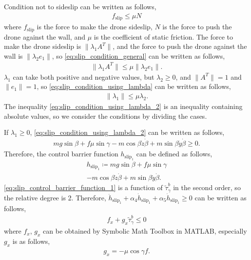 Condition not to sideslip can be written as follows,
\begin{align}
    \label{eq:slip_condition_general}
    f_{\mathrm{slip}} \leq \mu N
\end{align}
where $ f_{\mathrm{slip}} $ is the force to make the drone sideslip, $ N $ is the force to push the drone against the wall, and $ \mu $ is the coefficient of static friction.
The force to make the drone sideslip is $ \| \lambda_1 A^T \| $, and the force to push the drone against the wall is $ \| \lambda_2 e_1 \| $, so \eqref{eq:slip_condition_general} can be written as follows,
\begin{align}
    \label{eq:slip_condition_using_lambda}
    \| \lambda_1 A^T \| \leq \mu \| \lambda_2 e_1 \|.
\end{align}
$ \lambda_1 $ can take both positive and negative values, but $ \lambda_2 \geq 0 $, and $ \| A^T \| = 1 $ and $ \| e_1 \| = 1 $, so \eqref{eq:slip_condition_using_lambda} can be written as follows,
\begin{align}
    \label{eq:slip_condition_using_lambda_2}
    \| \lambda_1 \| \leq \mu \lambda_2.
\end{align}
The inequality \eqref{eq:slip_condition_using_lambda_2} is an inequality containing absolute values, so we consider the conditions by dividing the cases.

If $ \lambda_1 \geq 0 $, \eqref{eq:slip_condition_using_lambda_2} can be written as follows,
\begin{align}
    \label{eq:slip_condition_using_lambda_5}
    mg \sin \beta + f \mu \sin \gamma - m \cos \beta \dot{z} \dot{\beta} + m \sin \beta \dot{y} \dot{\beta} \geq 0.
\end{align}
Therefore, the control barrier function $ h_{\mathrm{slip}_1} $ can be defined as follows,
\begin{align}
    h_{\mathrm{slip}_1} \coloneqq mg \sin \beta + f \mu \sin \gamma \\
    - m \cos \beta \dot{z} \dot{\beta} + m \sin \beta \dot{y} \dot{\beta}.
    \label{eq:slip_control_barrier_function_1}
\end{align}
\eqref{eq:slip_control_barrier_function_1} is a function of $ \tilde{\tau}_{\gamma}^b $ in the second order, so the relative degree is 2.
Therefore, $ \ddot{h}_{\mathrm{slip}_1} + \alpha_4 \dot{h}_{\mathrm{slip}_1}  + \alpha_5 \dot{h}_{\mathrm{slip}_1} \geq 0 $ can be written as follows,
\begin{align}
    \label{eq:sideslipQP_1}
    f_x + g_x \tilde{\tau}_{\gamma}^b \leq 0
\end{align}
where $ f_x $, $ g_x $ can be obtained by Symbolic Math Toolbox in MATLAB, especially $ g_x $ is as follows,
\begin{align*}
    g_x = - \mu \cos \gamma f.
\end{align*}

